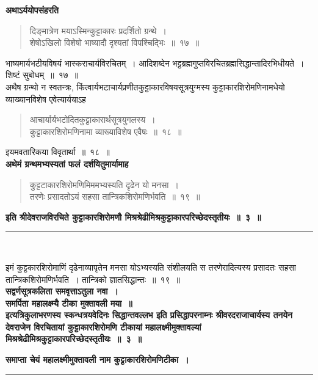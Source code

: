 \documentclass[11pt, openany]{book}
\begin{document}
\indent
\textbf{अथाऽर्ययोपसंहरति\textendash}

\begin{quote}
{\ks दिङ्मात्रेण मयाऽस्मिन्कुट्टाकारः प्रदर्शितो ग्रन्थे~।\\
शेषोऽखिलो विशेषो भाष्यादौ दृश्यतां विपश्चिद्भिः~॥~१७~॥}
\end{quote}

\indent
भाष्यमार्यभटीयविषयं भास्कराचार्यविरचितम्~। आदिशब्देन भट्टब्रह्मगुप्तविरचितब्रह्मसिद्धान्तादिरभिधीयते~। शिष्टं सुबोधम्~॥~१७~॥\\

\indent
अथैष ग्रन्थो न स्वतन्त्रः, किंत्वार्यभटाचार्यप्रणीतकुट्टाकारविषयसूत्रयुग्मस्य कुट्टाकारशिरोमणिनामधेयो व्याख्यानविशेष एवेत्यार्ययाऽह\textendash

\begin{quote}
{\ks आचार्यार्यभटोदितकुट्टाकारार्थसूत्रयुगलस्य~।\\
कुट्टाकारशिरोमणिनामा व्याख्याविशेष एवैषः~॥~१८~॥}
\end{quote}

\indent
इयमवतारिकया विवृतार्था~॥~१८~॥\\

\textbf{अथेमं ग्रन्थमभ्यस्यतां फलं दर्शयितुमार्यामाह\textendash}

\begin{quote}
\ks कुट्टटाकारशिरोमणिमिममभ्यस्यति दृढेन यो मनसा~।\\
तरणेः प्रसादतोऽयं सहसा तान्त्रिकशिरोमणिर्भवति~॥~१९~॥
\end{quote}

\centering
\textbf{इति श्रीदेवराजविरचिते कुट्टाकारशिरोमणौ मिश्रश्रेढीमिश्रकुट्टाकारपरिच्छेदस्तृतीयः~॥~३~॥\\}
\rule{0.2\linewidth}{1.0pt}\\

\vspace{1cm}
\justifying

\indent
इमं कुट्टकारशिरोमाणिं दृढेनाव्यापृतेन मनसा योऽभ्यस्यति संशीलयति स
तरणेरादित्यस्य प्रसादतः सहसा तान्त्रिकशिरोमणिर्भवति~। तान्त्रिको ज्ञातसिद्धान्तः~॥~१९~॥\\

\centering
\indent
 \textbf{सद्वर्णसूत्रकलिता समवृत्ताऽतुला नवा~।\\
  समर्पिता महालक्ष्म्यै टीका मुक्तावली मया~॥}\\

\indent
\textbf{इत्यत्रिकुलाभरणस्य स्कन्धत्रयवेदिनः सिद्धान्तवल्लभ इति प्रसिद्धापरनाम्नः
श्रीवरदराजाचार्यस्य तनयेन देवराजेन विरचितायां कुट्टाकारशिरोमणि
टीकायां महालक्ष्मीमुक्तावल्यां मिश्रश्रेढीमिश्रकुट्टाकारपरिच्छेदस्तृतीयः~॥~३~॥\\}

\indent
\textbf{समाप्ता चेयं महालक्ष्मीमुक्तावली नाम कुट्टाकारशिरोमणिटीका~।\\}
\centering
\rule{0.2\linewidth}{1.0pt}


 
\end{document}
